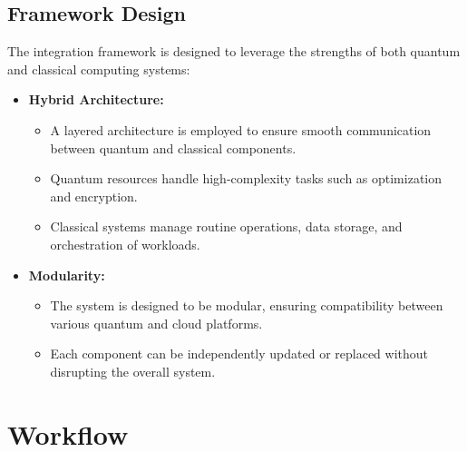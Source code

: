 \documentclass[12pt,a4paper]{article}
\begin{document}
\subsection{Framework Design}
The integration framework is designed to leverage the strengths of both quantum and classical computing systems:
\begin{itemize}
    \item \textbf{Hybrid Architecture:} 
    \begin{itemize}
        \item A layered architecture is employed to ensure smooth communication between quantum and classical components.
        \item Quantum resources handle high-complexity tasks such as optimization and encryption.
        \item Classical systems manage routine operations, data storage, and orchestration of workloads.
    \end{itemize}
    \item \textbf{Modularity:}
    \begin{itemize}
        \item The system is designed to be modular, ensuring compatibility between various quantum and cloud platforms.
        \item Each component can be independently updated or replaced without disrupting the overall system.
    \end{itemize}
\end{itemize}

\newpage

\begin{center}
    \fontsize{14}{16}\selectfont \bfseries
    \section{Workflow}
    \end{center}
\end{document}
